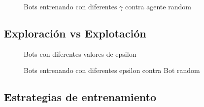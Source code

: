\begin{figure}[H]
\begin{center}
\caption{Bots entrenando con diferentes $\gamma$ contra agente random}
\label{fig:gamma}
\end{center}
\end{figure}

\subsection{Exploración vs Explotación}

\begin{figure}[H]
\begin{center}
\caption{Bots con diferentes valores de epsilon}
\label{fig:epsilon}
\end{center}
\end{figure}


\begin{figure}[H]
\begin{center}
\caption{Bots entrenando con diferentes epsilon contra Bot random}
\label{fig:epsilon2}
\end{center}
\end{figure}


\subsection{Estrategias de entrenamiento}
